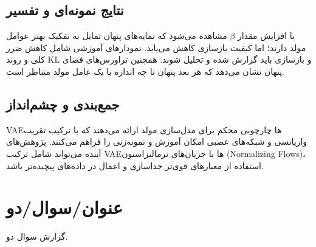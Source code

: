 \section{نتایج نمونه‌ای و تفسیر}
با افزایش مقدار $\beta$ مشاهده می‌شود که نمایه‌های پنهان تمایل به تفکیک بهتر عوامل مولد دارند؛ اما کیفیت بازسازی کاهش می‌یابد. نمودارهای آموزشی شامل کاهش ضرر کلی و روند KL و بازسازی باید گزارش شده و تحلیل شوند. همچنین تراورس‌های فضای پنهان نشان می‌دهد که هر بعد پنهان تا چه اندازه با یک عامل مولد متناظر است.

\section{جمع‌بندی و چشم‌انداز}
VAEها چارچوبی محکم برای مدل‌سازی مولد ارائه می‌دهند که با ترکیب تقریب واریانسی و شبکه‌های عصبی امکان آموزش و نمونه‌زنی را فراهم می‌کنند. پژوهش‌های آینده می‌تواند شامل ترکیب VAEها با جریان‌های نرمالیزاسیون (Normalizing Flows)، استفاده از معیارهای قوی‌تر جداسازی و اعمال در داده‌های پیچیده‌تر باشد.
\renewcommand{\chaptername}{سوال}
\chapter{عنوان/سوال/دو}
گزارش سوال دو.